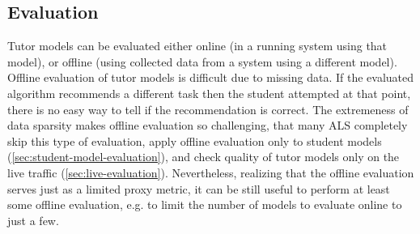 

\subsection{Evaluation}
\label{tutors.evaluation}

Tutor models can be evaluated either online (in a running system using that model),
or offline (using collected data from a system using a different model).
Offline evaluation of tutor models is difficult due to missing data.
If the evaluated algorithm recommends a different task then the student attempted
at that point, there is no easy way to tell if the recommendation is correct. %
The extremeness of data sparsity makes offline evaluation so challenging,
that many ALS completely skip this type of evaluation, %
apply offline evaluation only to student models (\cref{sec:student-model-evaluation}),
and check quality of tutor models only on the live traffic
(\cref{sec:live-evaluation}).
Nevertheless, realizing that the offline evaluation serves just as
a limited proxy metric,
it can be still useful to perform at least some offline evaluation,
e.g. to limit the number of models to evaluate online to just a few.

